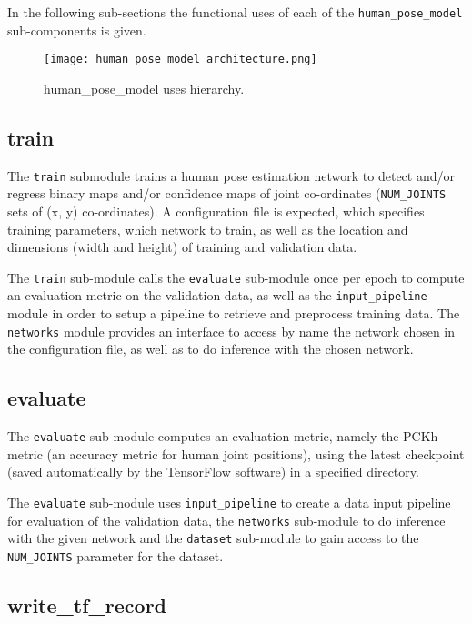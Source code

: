 \documentclass{scrreprt}
\begin{document}
In the following sub-sections the functional uses of each of the
\verb|human_pose_model| sub-components is given.

\begin{figure}[!ht]
        \centering
        \caption{human\_pose\_model uses hierarchy.}
        \texttt{[image: human\_pose\_model\_architecture.png]}
        \label{human_pose_model_arch}
\end{figure}

\subsection{train}

The \verb|train| submodule trains a human pose estimation network to detect
and/or regress binary maps and/or confidence maps of joint co-ordinates
(\verb|NUM_JOINTS| sets of (x, y) co-ordinates). A configuration file is
expected, which specifies training parameters, which network to train, as well
as the location and dimensions (width and height) of training and validation
data.

The \verb|train| sub-module calls the \verb|evaluate| sub-module once per epoch
to compute an evaluation metric on the validation data, as well as the
\verb|input_pipeline| module in order to setup a pipeline to retrieve and
preprocess training data. The \verb|networks| module provides an interface to
access by name the network chosen in the configuration file, as well as to do
inference with the chosen network.

\subsection{evaluate}

The \verb|evaluate| sub-module computes an evaluation metric, namely the PCKh
metric (an accuracy metric for human joint positions), using the latest
checkpoint (saved automatically by the TensorFlow software) in a specified
directory.

The \verb|evaluate| sub-module uses \verb|input_pipeline| to create a data
input pipeline for evaluation of the validation data, the \verb|networks|
sub-module to do inference with the given network and the \verb|dataset|
sub-module to gain access to the \verb|NUM_JOINTS| parameter for the dataset.

\subsection{write\_tf\_record}
\end{document}
